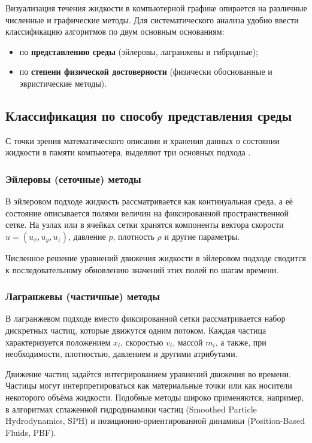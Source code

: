 Визуализация течения жидкости в компьютерной графике опирается на различные
численные и графические методы. Для систематического анализа удобно ввести
классификацию алгоритмов по двум основным основаниям:
\begin{itemize}
  \item по \textbf{представлению среды} (эйлеровы, лагранжевы и гибридные);
  \item по \textbf{степени физической достоверности} (физически обоснованные и эвристические методы).
\end{itemize}

\subsection{Классификация по способу представления среды}

С точки зрения математического описания и хранения данных о состоянии
жидкости в памяти компьютера, выделяют три основных подхода \cite{chinapaper}.

\subsubsection{Эйлеровы (сеточные) методы}

В эйлеровом подходе жидкость рассматривается как континуальная
среда, а её состояние описывается полями величин на фиксированной пространственной
сетке. На узлах или в ячейках сетки хранятся компоненты вектора скорости
$u = (u_x, u_y, u_z)$, давление $p$, плотность $\rho$ и другие
параметры.

Численное решение уравнений движения жидкости в эйлеровом подходе
сводится к последовательному обновлению значений этих полей по шагам времени.

\subsubsection{Лагранжевы (частичные) методы}

В лагранжевом подходе вместо фиксированной сетки рассматривается
набор дискретных частиц, которые движутся одним потоком. Каждая частица
характеризуется положением $x_i$, скоростью $v_i$, массой
$m_i$, а также, при необходимости, плотностью, давлением и другими атрибутами.

Движение частиц задаётся интегрированием уравнений движения во времени.
Частицы могут интерпретироваться как материальные точки или как носители
некоторого объёма жидкости. Подобные методы широко применяются, например,
в алгоритмах сглаженной гидродинамики частиц (Smoothed Particle Hydrodynamics, SPH)
и позиционно-ориентированной динамики (Position-Based Fluids, PBF).

